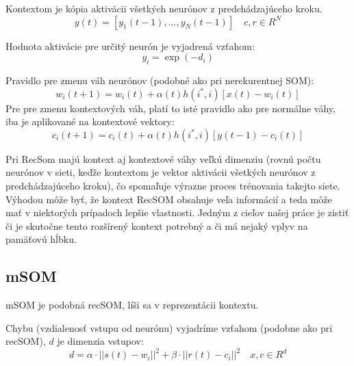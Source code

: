 Kontextom je kópia aktivácii všetkých neurónov z predchádzajúceho kroku.
\begin{equation}
	y(t) = [y_1(t-1), ..., y_{N}(t-1)]  \quad c, r \in R^{N}
\end{equation}

Hodnota aktivácie pre určitý neurón je vyjadrená vzťahom:
\begin{equation}
	y_i = \exp(-d_i)
\end{equation}

Pravidlo pre zmenu váh neurónov (podobné ako pri nerekurentnej SOM):
\begin{equation}
	w_i(t + 1) = w_i(t) + \alpha(t)h(i^*, i)[x(t) - w_i(t)]
\end{equation}
Pre pre zmenu kontextových váh, platí to isté pravidlo ako pre normálne váhy, iba je aplikované 
na kontextové vektory:
\begin{equation}
	c_i(t + 1) = c_i(t) + \alpha(t)h(i^*, i)[y(t - 1) - c_i(t)]
\end{equation}

Pri RecSom majú kontext aj kontextové váhy veľkú dimenziu (rovnú počtu neurónov v sieti, keďže kontextom je vektor aktivácii všetkých neurónov z predchádzajúceho kroku), 
čo spomaľuje výrazne proces trénovania takejto siete.
Výhodou môže byť, že kontext RecSOM obsahuje veľa informácií a teda môže mať v niektorých prípadoch
lepšie vlastnosti. 
Jedným z cieľov našej práce je zistiť či je skutočne tento rozšírený kontext potrebný a či 
má nejaký vplyv na pamäťovú hĺbku.


\subsection{mSOM}
mSOM je podobná recSOM, líši sa v reprezentácii kontextu. \cite{DBLP:journals/ijon/StrickertH05}

Chybu (vzdialenosť vstupu od neurónu) vyjadríme vzťahom (podobne ako pri recSOM), 
$d$ je dimenzia vstupov:
\begin{equation}
	d = \alpha \cdot ||s(t) - w_i||^{2} + \beta \cdot ||r(t) - c_i||^{2} \quad x, c \in R^{d}
\end{equation}

